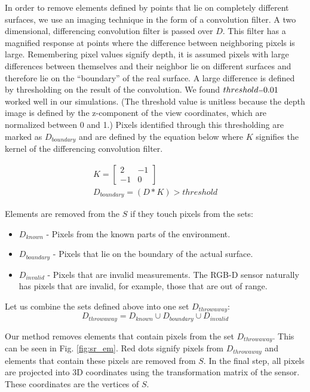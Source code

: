 In order to remove elements defined by points that lie on completely different
surfaces, we use an imaging technique in the form of a convolution filter. A two
dimensional, differencing convolution filter is passed over $D$. This filter has
a magnified response at points where the difference between neighboring pixels
is large. Remembering pixel values signify depth, it is assumed pixels with
large differences between themselves and their neighbor lie on different
surfaces and therefore lie on the ``boundary'' of the real surface. A large
difference is defined by thresholding on the result of the convolution. We found
$threshold\mathsmaller{=}0.01$ worked well in our simulations. (The threshold
value is unitless because the depth image is defined by the z-component of the
view coordinates, which are normalized between 0 and 1.) Pixels identified
through this thresholding are marked as $D_{boundary}$ and are defined by the
equation below where $K$ signifies the kernel of the differencing convolution
filter.

\begin{gather}
  K = \begin{bmatrix} 2 & -1 \\ -1 & 0 \end{bmatrix} \\
  D_{boundary} = (D \ast K) > threshold
\end{gather}

Elements are removed from the $S$ if they touch pixels from the sets:
\begin{itemize}
  \item $D_{known}$ - Pixels from the known parts of the environment.
  \item $D_{boundary}$ - Pixels that lie on the boundary of the actual surface.
  \item $D_{invalid}$ -  Pixels that are invalid measurements. The RGB-D sensor
  naturally has pixels that are invalid, for example, those that are out of
  range.
\end{itemize}

Let us combine the sets defined above into one set $D_{throwaway}$:
\begin{equation}
  D_{throwaway} = D_{known} \cup D_{boundary} \cup D_{invalid}
  \label{eqn:throwaway}
\end{equation}

Our method removes elements that contain pixels from the set $D_{throwaway}$.
This can be seen in Fig. \ref{fig:sr_em}. Red dots signify pixels from
$D_{throwaway}$ and elements that contain these pixels are removed from $S$. In
the final step, all pixels are projected into 3D coordinates using the
transformation matrix of the sensor. These coordinates are the vertices of $S$.

